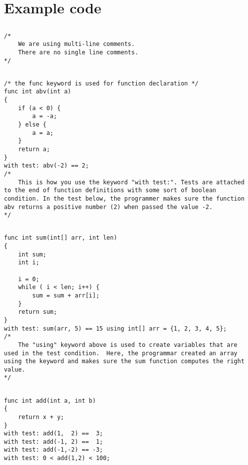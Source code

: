 \documentclass{article}
\begin{document}
	
\section{Example code}
\subsection{}
\begin{lstlisting}
/*
	We are using multi-line comments.
	There are no single line comments.
*/
\end{lstlisting}


\subsection{}
\begin{lstlisting}
/* the func keyword is used for function declaration */
func int abv(int a)
{
	if (a < 0) {
		a = -a;
	} else {
		a = a;
	}
	return a;
}
with test: abv(-2) == 2;
/*
	This is how you use the keyword "with test:". Tests are attached to the end of function definitions with some sort of boolean condition. In the test below, the programmer makes sure the function abv returns a positive number (2) when passed the value -2.
*/
\end{lstlisting}


\subsection{}
\begin{lstlisting}
func int sum(int[] arr, int len)
{
	int sum;
	int i;
	
	i = 0;
	while ( i < len; i++) {
		sum = sum + arr[i];
	}
	return sum;
}
with test: sum(arr, 5) == 15 using int[] arr = {1, 2, 3, 4, 5};
/*
	The "using" keyword above is used to create variables that are used in the test condition.  Here, the programmar created an array using the keyword and makes sure the sum function computes the right value.
*/
\end{lstlisting}


\subsection{}
\begin{lstlisting}
func int add(int a, int b)
{
	return x + y;
}
with test: add(1,  2) ==  3;
with test: add(-1, 2) ==  1;
with test: add(-1,-2) == -3;
with test: 0 < add(1,2) < 100;
\end{lstlisting}
\end{document}

